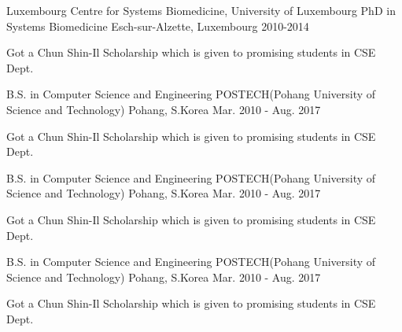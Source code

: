 

\begin{cventries}

  \cventry
    {Luxembourg Centre for Systems Biomedicine, University of Luxembourg} %
    {PhD in Systems Biomedicine} %
    {Esch-sur-Alzette, Luxembourg} %
    {2010-2014} %
    {
      \begin{cvitems} %
        \item {Got a Chun Shin-Il Scholarship which is given to promising students in CSE Dept.}
      \end{cvitems}
    }

  \cventry
  {B.S. in Computer Science and Engineering} %
  {POSTECH(Pohang University of Science and Technology)} %
  {Pohang, S.Korea} %
  {Mar. 2010 - Aug. 2017} %
  {
    \begin{cvitems} %
      \item {Got a Chun Shin-Il Scholarship which is given to promising students in CSE Dept.}
    \end{cvitems}
  }

  \cventry
  {B.S. in Computer Science and Engineering} %
  {POSTECH(Pohang University of Science and Technology)} %
  {Pohang, S.Korea} %
  {Mar. 2010 - Aug. 2017} %
  {
    \begin{cvitems} %
      \item {Got a Chun Shin-Il Scholarship which is given to promising students in CSE Dept.}
    \end{cvitems}
  }

  \cventry
  {B.S. in Computer Science and Engineering} %
  {POSTECH(Pohang University of Science and Technology)} %
  {Pohang, S.Korea} %
  {Mar. 2010 - Aug. 2017} %
  {
    \begin{cvitems} %
      \item {Got a Chun Shin-Il Scholarship which is given to promising students in CSE Dept.}
    \end{cvitems}
  }


\end{cventries}
